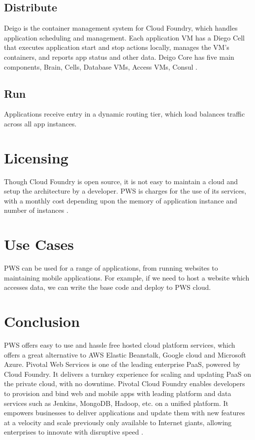 \documentclass[9pt,twocolumn,twoside]{../../styles/osajnl}
\begin{document}
\subsection{Distribute}
Deigo is the container management system for Cloud Foundry, which handles application scheduling and management. Each application VM has a Diego Cell that executes application start and stop actions locally, manages the VM’s containers, and reports app status and other data. Deigo Core has five main components, Brain, Cells, Database VMs, Access VMs, Consul \cite{www-pws-diego}.

\subsection{Run}
Applications receive entry in a dynamic routing tier, which load balances traffic across all app instances. 

\section{Licensing}
Though Cloud Foundry is open source, it is not easy to maintain a cloud and setup the architecture by a developer. PWS is charges for the use of its services, with a monthly cost depending upon the memory of application instance and number of instances \cite{www-pws-pricing}. 

\section{Use Cases}
PWS can be used for a range of applications, from running websites to maintaining mobile applications. For example, if we need to host a website which accesses data, we can write the base code and deploy to PWS cloud.

\section{Conclusion}
PWS offers easy to use and hassle free hosted cloud platform services, which offers a great alternative to AWS Elastic Beanstalk, Google cloud and Microsoft Azure. 
Pivotal Web Services is one of the leading enterprise PaaS, powered by Cloud Foundry. It delivers a turnkey experience for scaling and updating PaaS on the private cloud, with no downtime. Pivotal Cloud Foundry enables developers to provision and bind web and mobile apps with leading platform and data services such as Jenkins, MongoDB, Hadoop, etc. on a unified platform. It empowers businesses to deliver applications and update them with new features at a velocity and scale previously only available to Internet giants, allowing enterprises to innovate with disruptive speed \cite{www-pws-adv}. 
\end{document}
